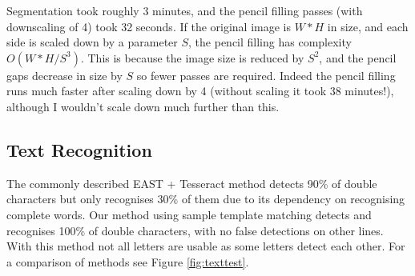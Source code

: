 \documentclass[conference]{IEEEtran}
\begin{document}
Segmentation took roughly 3 minutes, and the pencil filling passes (with downscaling of 4) took 32 seconds. If the original image is $W*H$ in size, and each side is scaled down by a parameter $S$, the pencil filling has complexity $O({W*H}/{S^3})$. This is because the image size is reduced by $S^2$, and the pencil gaps decrease in size by $S$ so fewer passes are required. Indeed the pencil filling runs much faster after scaling down by 4 (without scaling it took 38 minutes!), although I wouldn't scale down much further than this.

\subsection{Text Recognition}

The commonly described EAST + Tesseract method detects 90\% of double characters but only recognises 30\% of them due to its dependency on recognising complete words. Our method using sample template matching detects and recognises 100\% of double characters, with no false detections on other lines. With this method not all letters are usable as some letters detect each other. For a comparison of methods see Figure \ref{fig:texttest}.
\end{document}
